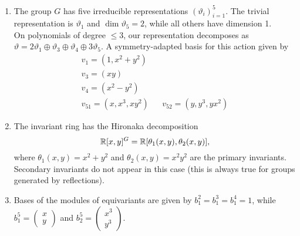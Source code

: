 \documentclass[]{article}
\begin{document}
\begin{enumerate}
    \item The group $G$ has five irreducible representations $(\vartheta_i)_{i=1}^5$. The trivial representation is $\vartheta_1$ and $\dim \vartheta_5=2$, while all others have dimension 1.\\
    On polynomials of degree $\leq3$, our representation decomposes as $\vartheta=2\vartheta_1\oplus\vartheta_3\oplus\vartheta_4\oplus3\vartheta_5$. A symmetry-adapted basis for this action given by   
    \begin{align*}
        v_1=(1,x^2+y^2)&&\\
        v_3=(xy)&&\\
        v_4=(x^2-y^2)&&\\
        v_{51}=(x,x^3,xy^2) && v_{52}=(y,y^3,yx^2)
    \end{align*}
    
    \item The invariant ring has the Hironaka decomposition
    \[
        \mathbb R[x,y]^G=\mathbb R[\theta_1(x,y),\theta_2(x,y)],
    \]
    where $\theta_1(x,y)=x^2+y^2$ and $\theta_2(x,y)=x^2y^2$ are the primary invariants. Secondary invariants do not appear in this case (this is always true for groups generated by reflections).\\ %
    
    \item Bases of the modules of equivariants are given by $b_1^2=b_1^3=b_1^4=1$, while $b_1^5=\begin{pmatrix}x\\y\end{pmatrix}$ and $b_2^5=\begin{pmatrix}x^3\\y^3\end{pmatrix}$.
    

\end{enumerate}
\end{document}
